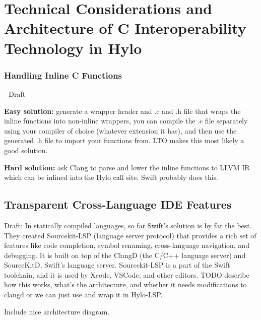 \section{Technical Considerations and Architecture of C Interoperability Technology in Hylo}

\subsubsection{Handling Inline C Functions}
\label{sec:handling_inline_c_functions}
- Draft - 

\textbf{Easy solution:} generate a wrapper header and .c and .h file that wraps the inline functions into non-inline wrappers, you can compile the .c file separately using your compiler of choice (whatever extension it has), and then use the generated .h file to import your functions from. LTO makes this most likely a good solution.

\textbf{Hard solution:} ask Clang to parse and lower the inline functions to LLVM IR which can be inlined into the Hylo call site. Swift probably does this.
















\subsection{Transparent Cross-Language IDE Features}
Draft: In statically compiled languages, so far Swift's solution is by far the best. They created Sourcekit-LSP (language server protocol) that provides a rich set of features like code completion, symbol renaming, cross-language navigation, and debugging. It is built on top of the ClangD (the C/C++ language server) and SourceKitD, Swift's language server. Sourcekit-LSP is a part of the Swift toolchain, and it is used by Xcode, VSCode, and other editors. TODO describe how this works, what's the architecture, and whether it needs modifications to clangd or we can just use and wrap it in Hylo-LSP.

Include nice architecture diagram.





































